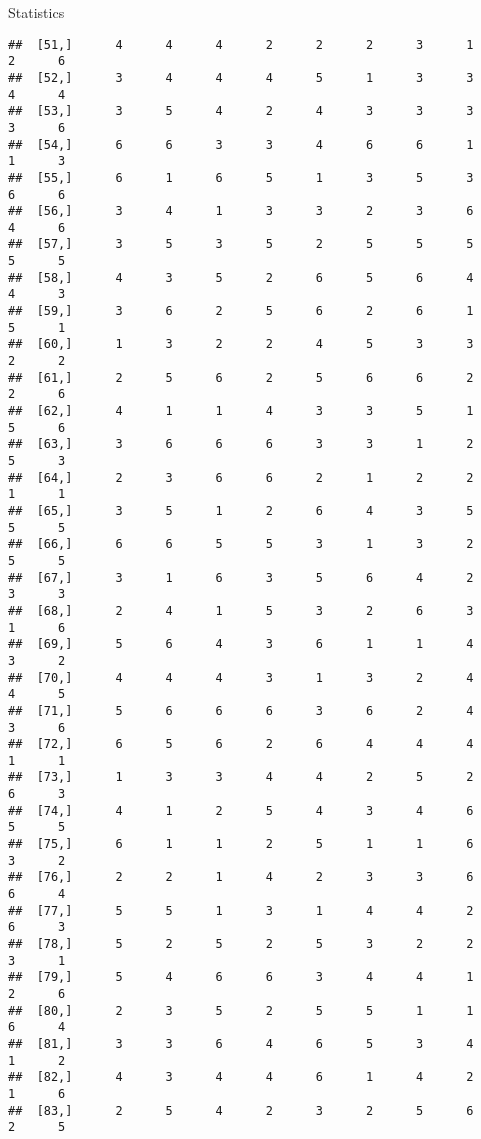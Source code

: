 \documentclass[
  ignorenonframetext,
]{beamer}
\begin{document}
\begin{frame}[fragile]{Statistics}
\begin{verbatim}
##  [51,]      4      4      4      2      2      2      3      1      2      6
##  [52,]      3      4      4      4      5      1      3      3      4      4
##  [53,]      3      5      4      2      4      3      3      3      3      6
##  [54,]      6      6      3      3      4      6      6      1      1      3
##  [55,]      6      1      6      5      1      3      5      3      6      6
##  [56,]      3      4      1      3      3      2      3      6      4      6
##  [57,]      3      5      3      5      2      5      5      5      5      5
##  [58,]      4      3      5      2      6      5      6      4      4      3
##  [59,]      3      6      2      5      6      2      6      1      5      1
##  [60,]      1      3      2      2      4      5      3      3      2      2
##  [61,]      2      5      6      2      5      6      6      2      2      6
##  [62,]      4      1      1      4      3      3      5      1      5      6
##  [63,]      3      6      6      6      3      3      1      2      5      3
##  [64,]      2      3      6      6      2      1      2      2      1      1
##  [65,]      3      5      1      2      6      4      3      5      5      5
##  [66,]      6      6      5      5      3      1      3      2      5      5
##  [67,]      3      1      6      3      5      6      4      2      3      3
##  [68,]      2      4      1      5      3      2      6      3      1      6
##  [69,]      5      6      4      3      6      1      1      4      3      2
##  [70,]      4      4      4      3      1      3      2      4      4      5
##  [71,]      5      6      6      6      3      6      2      4      3      6
##  [72,]      6      5      6      2      6      4      4      4      1      1
##  [73,]      1      3      3      4      4      2      5      2      6      3
##  [74,]      4      1      2      5      4      3      4      6      5      5
##  [75,]      6      1      1      2      5      1      1      6      3      2
##  [76,]      2      2      1      4      2      3      3      6      6      4
##  [77,]      5      5      1      3      1      4      4      2      6      3
##  [78,]      5      2      5      2      5      3      2      2      3      1
##  [79,]      5      4      6      6      3      4      4      1      2      6
##  [80,]      2      3      5      2      5      5      1      1      6      4
##  [81,]      3      3      6      4      6      5      3      4      1      2
##  [82,]      4      3      4      4      6      1      4      2      1      6
##  [83,]      2      5      4      2      3      2      5      6      2      5

\end{verbatim}
\end{frame}
\end{document}
